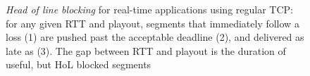 \begin{figure}
\centering
   \hfill
 \caption{\emph{Head of line blocking} for real-time applications using regular TCP: for any given
 RTT and playout, segments that immediately follow a loss (1) are pushed
 past the acceptable deadline (2), and delivered as late as (3). The gap between RTT
 and playout is the duration of useful, but HoL blocked segments}
\label{fig:HoLanal}
\end{figure}


